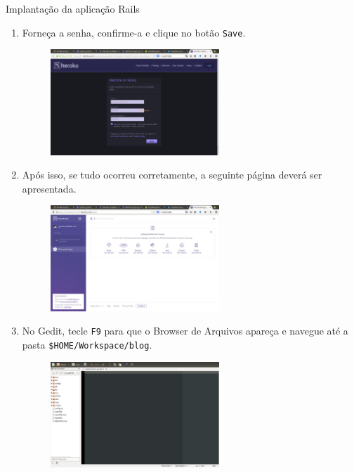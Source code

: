 \begin{frame}{Implantação da aplicação Rails}
\begin{enumerate}
 \framebreak
    \item Forneça a senha, confirme-a e clique no botão \verb!Save!.
    \begin{figure}[h!]
	\centering
	\includegraphics[width=0.60\textwidth]{devops/imagens/heroku-4.png}
    \end{figure}
    
\framebreak
    \item Após isso, se tudo ocorreu corretamente, a seguinte página deverá ser apresentada. 
    \begin{figure}[h!]
	\centering
	\includegraphics[width=0.60\textwidth]{devops/imagens/heroku-5.png}
    \end{figure}
  
\framebreak
    \item No Gedit, tecle \verb!F9! para que o \alert{Browser de Arquivos} apareça e navegue
      até a pasta \verb!$HOME/Workspace/blog!. 
    \begin{figure}[h!]
	\centering
	\includegraphics[width=0.60\textwidth]{devops/imagens/gedit-5.png}
    \end{figure}


\end{enumerate}
\end{frame}
